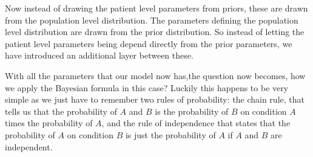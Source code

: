\documentclass[12pt,a4paper,leqno]{report}
\theoremstyle{plain}
\theoremstyle{definition}
\theoremstyle{remark}
\begin{document}

\bigskip

Now instead of drawing the patient level parameters from priors, these are drawn from
the population level distribution. The parameters defining the population level
distribution are drawn from the prior distribution. So instead of letting the patient
level parameters being depend directly from the prior parameters, we have introduced an
additional layer between these.

With all the parameters that our model now has,the question now becomes, how we apply
the Bayesian formula in this case? Luckily this happens to be very simple as we just
have to remember two rules of probability: the chain rule, that
tells us that the probability of $A$ and $B$ is the probability of $B$ on condition $A$
times the probability of $A$, and the rule of independence that states that the
probability of $A$ on condition $B$ is just the probability of $A$ if $A$ and $B$ are independent.
\end{document}

